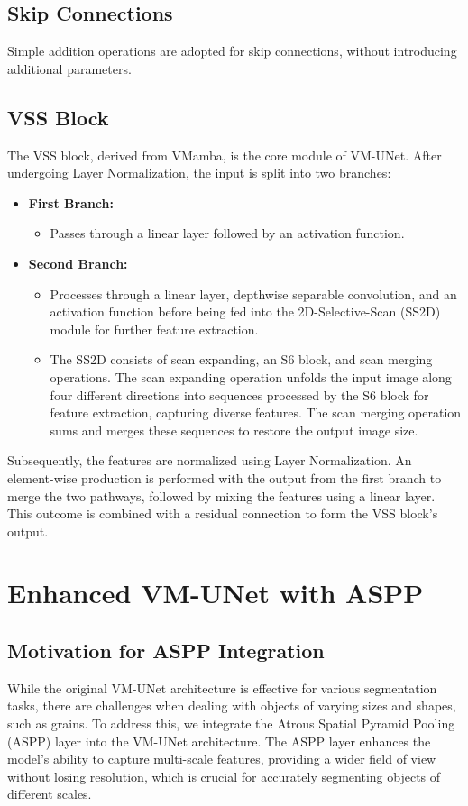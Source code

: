 \documentclass[conference]{IEEEtran}
\begin{document}
\subsection{Skip Connections}
Simple addition operations are adopted for skip connections, without introducing additional parameters.

\subsection{VSS Block}
The VSS block, derived from VMamba, is the core module of VM-UNet. After undergoing Layer Normalization, the input is split into two branches:

\begin{itemize}
    \item \textbf{First Branch:}
    \begin{itemize}
        \item Passes through a linear layer followed by an activation function.
    \end{itemize}
    \item \textbf{Second Branch:}
    \begin{itemize}
        \item Processes through a linear layer, depthwise separable convolution, and an activation function before being fed into the 2D-Selective-Scan (SS2D) module for further feature extraction.
        \item The SS2D consists of scan expanding, an S6 block, and scan merging operations. The scan expanding operation unfolds the input image along four different directions into sequences processed by the S6 block for feature extraction, capturing diverse features. The scan merging operation sums and merges these sequences to restore the output image size.
    \end{itemize}
\end{itemize}

Subsequently, the features are normalized using Layer Normalization. An element-wise production is performed with the output from the first branch to merge the two pathways, followed by mixing the features using a linear layer. This outcome is combined with a residual connection to form the VSS block’s output.

\section{Enhanced VM-UNet with ASPP}

\subsection{Motivation for ASPP Integration}
While the original VM-UNet architecture is effective for various segmentation tasks, there are challenges when dealing with objects of varying sizes and shapes, such as grains. To address this, we integrate the Atrous Spatial Pyramid Pooling (ASPP) layer into the VM-UNet architecture. The ASPP layer enhances the model's ability to capture multi-scale features, providing a wider field of view without losing resolution, which is crucial for accurately segmenting objects of different scales.
\end{document}
